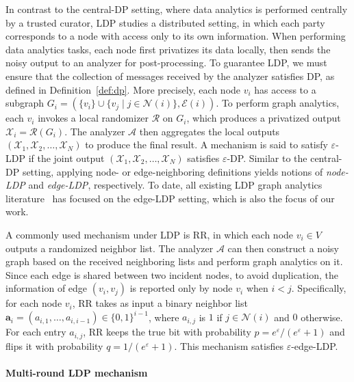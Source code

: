 In contrast to the central-DP setting, where data analytics is performed centrally by a trusted curator, 
LDP studies a distributed setting,
in which each party corresponds to a node with access only to its own information. 
When performing data analytics tasks, each node first privatizes its data locally, then sends the noisy output to an analyzer for post-processing.
To guarantee LDP, we must ensure that the collection of messages received by the analyzer satisfies DP, as defined in Definition~\ref{def:dp}.
More precisely, each node $v_i$ has access to a subgraph $G_i = \left(\{v_i\} \cup \{v_j \mid j \in \mathcal{N}(i)\}, \mathcal{E}(i)\right)$.
To perform graph analytics,
each $v_i$ invokes 
a local randomizer $\mathcal{R}$ on $G_i$, which produces a privatized output $\mathcal{X}_i = \mathcal{R}(G_i)$.
The analyzer $\mathcal{A}$ then aggregates the local outputs $(\mathcal{X}_1, \mathcal{X}_2, \dots, \mathcal{X}_N)$ to produce the final result.
A mechanism is said to satisfy $\varepsilon$-LDP if the joint output $(\mathcal{X}_1, \mathcal{X}_2, \dots, \mathcal{X}_N)$ satisfies $\varepsilon$-DP.
Similar to the central-DP setting, applying node- or edge-neighboring definitions yields notions of \textit{node-LDP} and \textit{edge-LDP}, respectively.
To date, all existing LDP graph analytics literature~\cite{sun2019analyzing,ye2020towards, ye2020lf,Imola2021, Imola2022,eden2023triangle, he2025robust} has focused on the edge-LDP setting, which is also the focus of our work.




A commonly used mechanism under LDP is RR, in which each node $v_i \in V$ outputs a randomized neighbor list. 
The analyzer $\mathcal{A}$ can then construct a noisy graph based on the received neighboring lists and perform graph analytics on it.
Since each edge is shared between two incident nodes, to avoid duplication, the information of edge $(v_i,v_j)$ is reported only by node $v_i$ when $i < j$.
Specifically, for each node $v_i$, RR takes as input a binary neighbor list $\textbf{a}_i = (a_{i,1}, \dots, a_{i,i-1}) \in \{0, 1\}^{i-1}$, where $a_{i,j}$ is $1$ if $j \in \mathcal{N}(i)$ and $0$ otherwise. 
For each entry $a_{i,j}$, RR keeps the true bit with probability $p ={e^\varepsilon}/({e^\varepsilon + 1})$ and flips it with probability $q = {1}/({e^\varepsilon + 1})$. 
This mechanism satisfies $\varepsilon$-edge-LDP.






\paragraph{Multi-round LDP mechanism}


